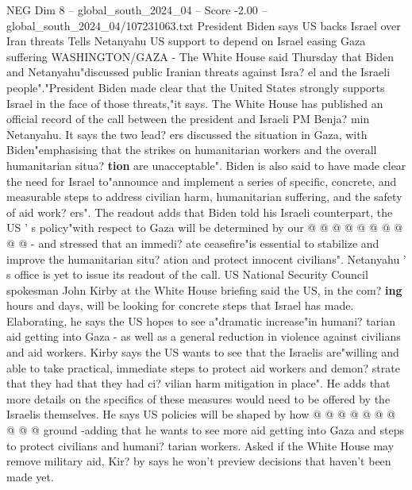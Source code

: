 \begin{textsample}{NEG Dim 8 – global\_south\_2024\_04 – Score -2.00 – global\_south\_2024\_04/107231063.txt}  \label{ex:f8_neg_029}
President Biden says US backs Israel over Iran threats Tells Netanyahu US support to depend on Israel easing Gaza suffering WASHINGTON/GAZA - The White House said Thursday that Biden and Netanyahu"discussed public Iranian threats against Isra? el and the Israeli people"."President Biden made clear that the United States strongly supports Israel in the face of those threats,"it says.
The White House has published an official record of the call between the president and Israeli PM Benja? min Netanyahu.
It says the two lead? ers discussed the situation in Gaza, with Biden"emphasising that the strikes on humanitarian workers and the overall humanitarian situa? \textbf{tion} are unacceptable".
Biden is also said to have made clear the need for Israel to"announce and implement a series of specific, concrete, and measurable steps to address civilian harm, humanitarian suffering, and the safety of aid work? ers".
The readout adds that Biden told his Israeli counterpart, the US ' s policy"with respect to Gaza will be determined by our @ @ @ @ @ @ @ @ @ @ - and stressed that an immedi? ate ceasefire"is essential to stabilize and improve the humanitarian situ? ation and protect innocent civilians".
Netanyahu ' s office is yet to issue its readout of the call.
US National Security Council spokesman John Kirby at the White House briefing said the US, in the com? \textbf{ing} hours and days, will be looking for concrete steps that Israel has made.
Elaborating, he says the US hopes to see a"dramatic increase"in humani? tarian aid getting into Gaza - as well as a general reduction in violence against civilians and aid workers.
Kirby says the US wants to see that the Israelis are"willing and able to take practical, immediate steps to protect aid workers and demon? strate that they had that they had ci? vilian harm mitigation in place".
He adds that more details on the specifics of these measures would need to be offered by the Israelis themselves.
He says US policies will be shaped by how @ @ @ @ @ @ @ @ @ @ ground -adding that he wants to see more aid getting into Gaza and steps to protect civilians and humani? tarian workers.
Asked if the White House may remove military aid, Kir? by says he won't preview decisions that haven't been made yet.

\end{textsample}
